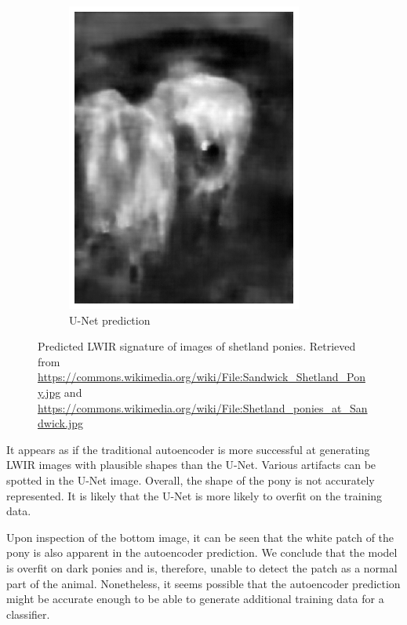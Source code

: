 \documentclass{l4proj}
\begin{document}
\begin{figure}[ht]
\begin{subfigure}[h!]{0.22\textwidth}
    \includegraphics[width=\textwidth]{images/autoencoder/pony_2/unet.png}
    \caption{U-Net prediction}
  \end{subfigure}
  \caption{Predicted LWIR signature of images of shetland ponies. Retrieved from \url{https://commons.wikimedia.org/wiki/File:Sandwick_Shetland_Pony.jpg} and \url{https://commons.wikimedia.org/wiki/File:Shetland_ponies_at_Sandwick.jpg}}
  \label{fig:autoencoder_pony}
\end{figure}

It appears as if the traditional autoencoder is more successful at generating LWIR images with plausible shapes than the U-Net. Various artifacts can be spotted in the U-Net image. Overall, the shape of the pony is not accurately represented. It is likely that the U-Net is more likely to overfit on the training data.

Upon inspection of the bottom image, it can be seen that the white patch of the pony is also apparent in the autoencoder prediction. We conclude that the model is overfit on dark ponies and is, therefore, unable to detect the patch as a normal part of the animal. Nonetheless, it seems possible that the autoencoder prediction might be accurate enough to be able to generate additional training data for a classifier.
\end{document}
